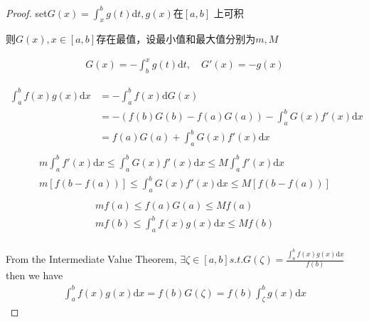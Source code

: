 \begin{proof}
set$ G(x) = \int_{x}^{b}g(t)\text{d}t , g(x)\text{在}[a,b] $	上可积

则$ G(x),x\in [a,b] $存在最值，设最小值和最大值分别为$ m,M $

\begin{align*}
	G(x) = -\int_{b}^{x}g(t)\text{d}t,\quad  G'(x) = -g(x)
\end{align*}

\begin{equation}
\begin{aligned}
	\int_{a}^{b}f(x)g(x)\text{d}x &= -\int_{a}^{b}f(x)\text{d}G(x)\\
	&=-{(f(b)G(b) - f(a)G(a)) -\int_{a}^{b}G(x)f'(x)\text{d}x }\\
	&= f(a)G(a)+ \int_{a}^{b}G(x)f'(x)\text{d}x\\
\end{aligned}
\end{equation}
\begin{align*}
	m\int_{a}^{b}f'(x)\text{d}x \leqslant \int_{a}^{b} G(x)f'(x)\text{d}x \leqslant M\int_{a}^{b}f'(x)\text{d}x\\
	m[f(b-f(a))] \leqslant  \int_{a}^{b} G(x)f'(x)\text{d}x \leqslant M[f(b-f(a))]\\
\end{align*}
\begin{align*}
	mf(a) \leqslant  f(a)G(a) \leqslant Mf(a)\\	
	mf(b) \leqslant  \int_{a}^{b} f(x)g(x) \text{d}x \leqslant Mf(b)\\	
\end{align*}


From the Intermediate Value Theorem, $ \exists \zeta \in [a,b] s.t. G(\zeta) = \frac{\int_{a}^{b}f(x)g(x)\text{d}x}{f(b)} $\\
then we have
\begin{align*}
	\int_{a}^{b}f(x)g(x)\text{d}x = f(b)G(\zeta) = f(b)\int_{\zeta}^{b}g(x)\text{d}x
\end{align*}


\end{proof}



